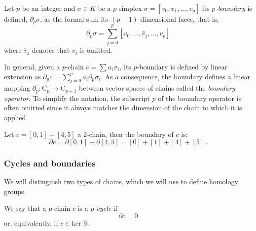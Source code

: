\documentclass[../main.tex]{subfiles}
\begin{document}
\begin{definition}
Let $p$ be an integer and $\sigma \in K$ be a $p$-simplex $\sigma = [v_0, v_1, ..., v_p]$ its \emph{$p$-boundary} is defined, $\partial_p\sigma$, as the formal sum its $(p-1)$-dimensional faces, that is,
\[
\partial_p\sigma = \sum_{j=0}^{p}[v_0, ..., \hat{v}_j, ..., v_p]
\]
where $\hat{v}_j$ denotes that $v_j$ is omitted.
\end{definition}

In general, given a $p$-chain $c =\sum a_i\sigma_i$, its $p$-boundary is defined by linear extension as $\partial_p c= \sum_{j=0}^{p} a_i \partial_p \sigma_i $. As a consequence, the boundary defines a linear mapping $\partial_p: \text{C}_p \to \text{C}_{p-1}$ between vector spaces of chains called the \emph{boundary operator}. To simplify the notation, the subscript $p$ of the boundary operator is often omitted since it always matches the dimension of the chain to which it is applied.


\begin{exmp}
Let $c = [0,1] + [4,5]$ a $2$-chain, then the boundary of $c$ is:
\[
\partial c = \partial [0,1] + \partial [4,5] = [0] + [1] + [4] + [5]\,.
\]
\end{exmp}

\subsubsection*{Cycles and boundaries}
We will distinguish two types of chains, which we will use to define homology groups.
\begin{definition}
We say that a $p$-chain $c$ is a \emph{$p$-cycle} if
\[
\partial c = 0
\]
or, equivalently, if $c \in \text{ker }\partial$.
\end{definition}
\end{document}

